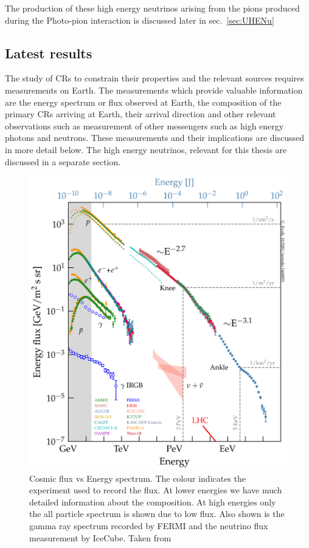 The production of these high energy neutrinos arising from the pions produced during the Photo-pion interaction is discussed later in sec.~\ref{sec:UHENu} 

\subsection{Latest results}
\label{subsec:CRresults}
The study of \glspl{CR} to constrain their properties and the relevant sources requires measurements on Earth. The measurements which provide valuable information are the energy spectrum or flux observed at Earth, the composition of the primary \glspl{CR} arriving at Earth, their arrival direction and other relevant observations such as measurement of other messengers such as high energy photons and neutrons. These measurements and their implications are discussed in more detail below. The high energy neutrinos, relevant for this thesis are discussed in a separate section. 

\begin{figure}[t!]
  \centering
  \includegraphics[width=14.5cm]{thesis_figures/CRnNu/all_particle_spectrum.png}
  \caption{Cosmic flux vs Energy spectrum. The colour indicates the experiment used to record the flux. At lower energies we have much detailed information about the composition. At high energies only the all particle spectrum is shown due to low flux. Also shown is the gamma ray spectrum recorded by FERMI and the neutrino flux measurement by IceCube. Taken from ~\cite{evoli_2018_2360277}}
  \label{fig:CR-spectrum}
\end{figure}
